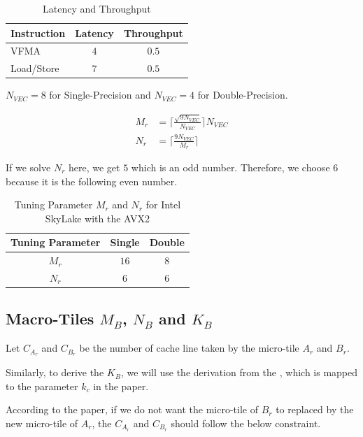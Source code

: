 \begin{table}[ht]
    \centering
    \caption{Latency and Throughput}
    \begin{tabular}{|l|c|c|}
        \hline
        \textbf{Instruction} & \textbf{Latency} & \textbf{Throughput}\\
        \hline
        VFMA        & $4$ & $0.5$ \\
        \hline
        Load/Store  & $7$ & $0.5$ \\
        \hline
    \end{tabular}
\end{table}

$N_{VEC} = 8$ for Single-Precision and $N_{VEC} = 4$ for Double-Precision.

\begin{align*}
    M_r &= \lceil \frac{ \sqrt{9 N_{VEC}} }{N_{VEC}} \rceil N_{VEC} \\
    N_r &= \lceil \frac{ 9 N_{VEC} }{M_r} \rceil
\end{align*}

If we solve $N_r$ here, we get $5$ which is an odd number. 
Therefore, we choose $6$ because it is the following even number.

\begin{table}[ht]
    \centering
    \caption{Tuning Parameter $M_r$ and $N_r$ for Intel SkyLake with the AVX2}
    \begin{tabular}{|c|c|c|}
        \hline
        \textbf{Tuning Parameter} & \textbf{Single} & \textbf{Double}\\
        \hline
        $M_r$   & $16$ & $8$ \\
        \hline
        $N_r$   & $6$ & $6$ \\
        \hline
    \end{tabular}
\end{table}

\subsection{Macro-Tiles $M_B$, $N_B$ and $K_B$}

Let $C_{A_r}$ and $C_{B_r}$ be the number of cache line taken by the micro-tile $A_r$ and $B_r$.

Similarly, to derive the $K_B$, we will use the derivation from the \cite{BLIS}, which is 
mapped to the parameter $k_c$ in the paper.

According to the paper, if we do not want the micro-tile of $B_r$ 
to replaced by the new micro-tile of $A_r$, the $C_{A_r}$ and $C_{B_r}$  should 
follow the below constraint.

